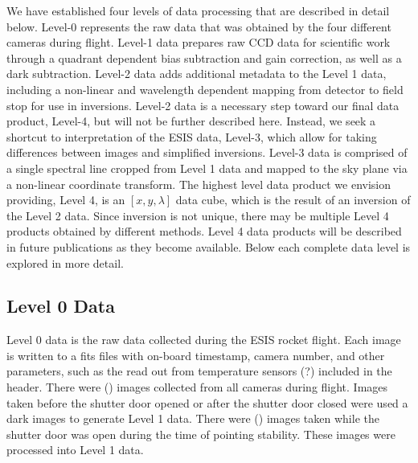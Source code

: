     We have established four levels of data processing that are described in detail below.
    Level-0 represents the raw data that was obtained by the four different cameras during flight.
    Level-1 data prepares raw CCD data for scientific work through a quadrant dependent bias subtraction and gain correction, as well as a dark subtraction.  
    Level-2 data adds additional metadata to the Level 1 data, including a non-linear and wavelength dependent mapping from detector to field stop for use in inversions. 
    Level-2 data is a necessary step toward our final data product, Level-4, but will not be further described here. 
    Instead, we seek a shortcut to interpretation of the ESIS data, Level-3, which allow for taking differences between images and simplified inversions.
    Level-3 data is comprised of a single spectral line cropped from Level 1 data and mapped to the sky plane via a non-linear coordinate transform.
    The highest level data product we envision providing, Level 4, is an $[x, y , \lambda]$ data cube, which is the result of an inversion of the Level 2 data. Since inversion is not unique, there may be multiple Level 4 products obtained by different methods.  Level 4 data products will be described in future publications as they become available.  
    Below each complete data level is explored in more detail.
    
    \subsection{Level 0 Data}
	    Level 0 data is the raw data collected during the ESIS rocket flight.  
	    Each image is written to a fits files with on-board timestamp, camera number, and other parameters, such as the read out from temperature sensors (?) included in the header.  There were () images collected from all cameras during flight.  
	    Images taken before the shutter door opened or after the shutter door closed were used a dark images to generate Level 1 data.  
	    There were () images taken while the shutter door was open during the time of pointing stability.  
	    These images were processed into Level 1 data.  

